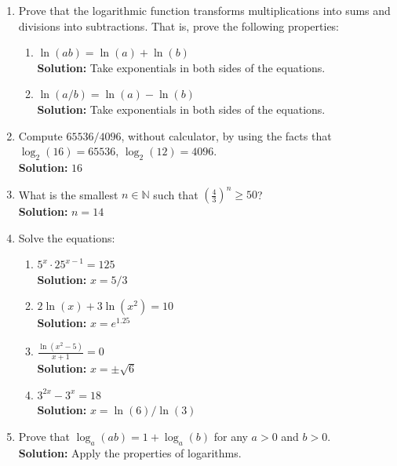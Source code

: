 \documentclass{article}
\begin{document}
\begin{enumerate}[leftmargin = 0.5cm, label = \arabic*., rightmargin = 0.2cm]

    \item Prove that the logarithmic function transforms multiplications into sums and divisions into subtractions. That is, prove the following properties: 
    \begin{enumerate}[leftmargin = 0.5cm, label = \alph*., rightmargin = 0.2cm]
        \item $\ln(ab) = \ln(a) + \ln(b)$ \\ \textbf{Solution:} Take exponentials in both sides of the equations.
        \item $\ln(a/b) = \ln(a) - \ln(b)$ \\ \textbf{Solution:} Take exponentials in both sides of the equations.
    \end{enumerate}

    \item Compute $65536 / 4096$, without calculator, by using the facts that $\log_2(16) = 65536$, $\log_2(12) = 4096$. \\
    \textbf{Solution:} \( 16 \)

    \item What is the smallest $n \in \mathbb{N}$ such that $\left( \frac{4}{3} \right)^n \geq 50$? \\
    \textbf{Solution:} \( n = 14 \)

    \item Solve the equations:
    
    \begin{enumerate}[leftmargin = 0.5cm, label = (\alph*), rightmargin = 0.2cm]
    
        \item $5^x \cdot 25^{x-1} = 125$ \\ \textbf{Solution:} \( x = 5/3 \)
        \item $2 \ln(x) + 3 \ln(x^2) = 10$ \\ \textbf{Solution:} \( x = e^{1.25} \)
        \item $\frac{\ln(x^2 - 5)}{x + 1} = 0$ \\ \textbf{Solution:} \( x = \pm\sqrt{6} \)
        \item $3^{2x} - 3^{x} = 18$ \\ \textbf{Solution:} \( x = \ln(6)/\ln(3) \)
    
    \end{enumerate}

    \item Prove that $\log_a(ab) = 1 + \log_a(b)$ for any $a > 0$ and $b > 0$. \\
    \textbf{Solution:} Apply the properties of logarithms.


\end{enumerate}
\end{document}
